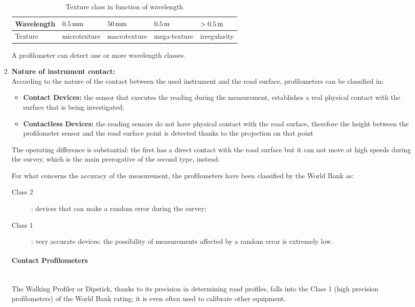 \documentclass[tesi]{subfiles}
\begin{document}
\begin{enumerate}
\begin{table}[H]
\begin{tabular}{ | l | l | l | l | l |}
    \hline
    Wavelength & \quad $\num{0.5} \thinspace \si{\milli\meter}$ & \quad $\num{50} \thinspace \si{\milli\meter}$ & \quad $\num{0.5}\thinspace \si{\meter}$ & $ > \num{0.5} \thinspace \si{\meter} $  \\ \hline
   \quad  Texture & microtexture& macrotexture &mega-texture &	irregularity \\

\hline
    \end{tabular}
 \caption{Texture class in function of wavelength}
\end{table}
A profilometer can detect one or more wavelength classes.
\clearpage
\item \textbf{Nature of instrument contact:}\label{ssc:Instrument_Contact}\leavevmode\\
According to the nature of the contact between the used instrument and the road surface, profilometers can be classified in:
\begin{itemize}
\item \textbf{Contact Devices:} the sensor that executes the reading during the measurement, establishes a real physical contact with the surface that is being investigated;

\item \textbf{Contactless Devices:} the reading sensors do not have physical contact with the road surface, therefore the height between the profilometer sensor and the road surface point is detected thanks to the projection on that point
\end{itemize}
The operating difference is substantial: the first has a direct contact with the road surface but it can not move at high speeds during the survey, which is the main prerogative of the second type, instead. 

For what concerns the accuracy of the measurement, the profilometers have been classified by the World Bank\cite{sayers1995calculation} as:
\begin{description}

	\item [Class 2]: devices that can make a random error during the survey;
	\item [Class 1]: very accurate devices: the possibility of measurements affected by a random error is extremely low.

\end{description}

\paragraph{Contact Profilometers}\leavevmode\\
The Walking Profiler or Dipstick\cite{little_book}, thanks to its precision in determining road profiles, falls into the Class 1 (high precision profilometers) of the World Bank rating\cite{sayers1995calculation}; it is even often used to calibrate other equipment.



\end{enumerate}
\end{document}
